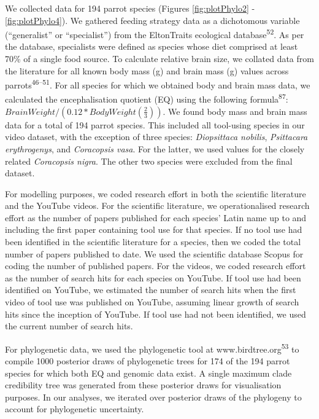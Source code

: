 \documentclass[
  man, donotrepeattitle,floatsintext]{apa6}
\begin{document}
We collected data for 194 parrot species (Figures
\ref{fig:plotPhylo2} - \ref{fig:plotPhylo4}). We gathered feeding strategy
data as a dichotomous variable (``generalist'' or ``specialist'') from the
EltonTraits ecological database\textsuperscript{52}. As per the database, specialists
were defined as species whose diet comprised at least 70\% of a single food
source. To calculate relative brain size, we collated data from the literature
for all known body mass (g) and brain mass (g) values across
parrots\textsuperscript{46--51}. For all species for which we obtained body and brain mass data, we
calculated the encephalisation quotient (EQ) using the following
formula\textsuperscript{87}: \(BrainWeight / (0.12 * BodyWeight(\frac{2}{3}))\). We
found body mass and brain mass data for a total of 194 parrot species. This
included all tool-using species in our video dataset, with the exception of
three species: \emph{Diopsittaca nobilis}, \emph{Psittacara erythrogenys}, and \emph{Coracopsis
vasa}. For the latter, we used values for the closely related \emph{Coracopsis
nigra}. The other two species were excluded from the final dataset.

For modelling purposes, we coded research effort in both the scientific
literature and the YouTube videos. For the scientific literature, we
operationalised research effort as the number of papers published for each
species' Latin name up to and including the first paper containing tool use for
that species. If no tool use had been identified in the scientific literature
for a species, then we coded the total number of papers published to date. We
used the scientific database Scopus for coding the number of published papers.
For the videos, we coded research effort as the number of search hits for each
species on YouTube. If tool use had been identified on YouTube, we estimated the
number of search hits when the first video of tool use was published on YouTube,
assuming linear growth of search hits since the inception of YouTube. If tool
use had not been identified, we used the current number of search hits.

For phylogenetic data, we used the phylogenetic tool at www.birdtree.org\textsuperscript{53} to compile 1000 posterior draws of phylogenetic trees for 174 of the
194 parrot species for which both EQ and genomic data exist. A single maximum
clade credibility tree was generated from these posterior draws for
visualisation purposes. In our analyses, we iterated over posterior draws of the
phylogeny to account for phylogenetic uncertainty.
\end{document}
